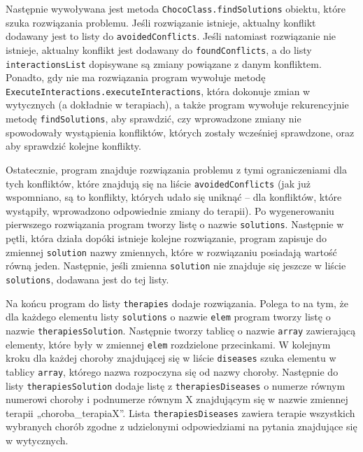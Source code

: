 Następnie wywoływana jest metoda \texttt{ChocoClass.findSolutions} obiektu, które szuka rozwiązania problemu. Jeśli rozwiązanie istnieje, aktualny konflikt dodawany jest to listy do \texttt{avoidedConflicts}. Jeśli natomiast rozwiązanie nie istnieje, aktualny konflikt jest dodawany do \texttt{foundConflicts}, a do listy \texttt{interactionsList} dopisywane są zmiany powiązane z danym konfliktem. Ponadto, gdy nie ma rozwiązania program wywołuje metodę \texttt{ExecuteInteractions.execute\-Interactions}, która dokonuje zmian w wytycznych (a dokładnie w terapiach), a także program wywołuje rekurencyjnie metodę \texttt{findSolutions}, aby sprawdzić, czy wprowadzone zmiany nie spowodowały wystąpienia konfliktów, których zostały wcześniej sprawdzone, 
oraz aby sprawdzić kolejne konflikty. 

Ostatecznie, program znajduje rozwiązania problemu z tymi ograniczeniami dla tych konfliktów, które znajdują się na liście \texttt{avoidedConflicts} (jak już wspomniano, są to konflikty, których udało się uniknąć -- dla konfliktów, które wystąpiły, wprowadzono odpowiednie zmiany do terapii). Po wygenerowaniu pierwszego rozwiązania program tworzy listę o nazwie \texttt{solutions}. Następnie w pętli, która działa dopóki istnieje kolejne rozwiązanie, program zapisuje do zmiennej \texttt{solution} nazwy zmiennych, które w rozwiązaniu posiadają wartość równą jeden. Następnie, jeśli zmienna \texttt{solution} nie znajduje się jeszcze w liście \texttt{solutions}, dodawana jest do tej listy. 


Na końcu program do listy \texttt{therapies} dodaje rozwiązania. Polega to na tym, że dla każdego elementu listy \texttt{solutions} o nazwie \texttt{elem} program tworzy listę o nazwie \texttt{therapiesSolution}. Następnie tworzy tablicę o nazwie \texttt{array} zawierającą elementy, które były w zmiennej \texttt{elem} rozdzielone przecinkami. W kolejnym kroku dla każdej choroby znajdującej się w liście \texttt{diseases} szuka elementu w tablicy \texttt{array}, którego nazwa rozpoczyna się od nazwy choroby. Następnie do listy \texttt{therapiesSolution} dodaje listę z \texttt{therapiesDiseases} o numerze równym numerowi choroby i podnumerze równym X znajdującym się w nazwie zmiennej terapii „choroba\_terapiaX”. Lista \texttt{therapiesDiseases} zawiera terapie wszystkich wybranych chorób zgodne z udzielonymi odpowiedziami na pytania znajdujące się w wytycznych. 

